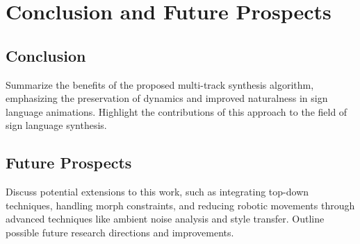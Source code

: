 \documentclass[../../main.tex]{subfiles}
\begin{document}
\section{Conclusion and Future Prospects}

\subsection{Conclusion}
Summarize the benefits of the proposed multi-track synthesis algorithm, emphasizing the preservation of dynamics and improved naturalness in sign language animations. Highlight the contributions of this approach to the field of sign language synthesis.

\subsection{Future Prospects}
Discuss potential extensions to this work, such as integrating top-down techniques, handling morph constraints, and reducing robotic movements through advanced techniques like ambient noise analysis and style transfer. Outline possible future research directions and improvements.
\end{document}
